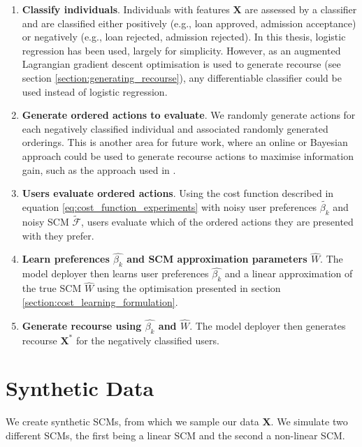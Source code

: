 \begin{enumerate}
	\item \textbf{Classify individuals}. Individuals with features $\mathbf{X}$ are assessed by a classifier and are classified either positively (e.g., loan approved, admission acceptance) or negatively (e.g., loan rejected, admission rejected). In this thesis, logistic regression has been used, largely for simplicity. However, as an augmented Lagrangian gradient descent optimisation is used to generate recourse (see section \ref{section:generating_recourse}), any differentiable classifier could be used instead of logistic regression.
	
	\item \textbf{Generate ordered actions to evaluate}. We randomly generate actions for each negatively classified individual and associated randomly generated orderings. This is another area for future work, where an online or Bayesian approach could be used to generate recourse actions to maximise information gain, such as the approach used in \textcite{detoniPersonalizedAlgorithmicRecourse2023}.
	
	\item \textbf{Users evaluate ordered actions}. Using the cost function described in equation \ref{eq:cost_function_experiments} with noisy user preferences $\tilde{\beta_k}$ and noisy SCM $\tilde{\mathcal{F}}$, users evaluate which of the ordered actions they are presented with they prefer. 
	
	\item \textbf{Learn preferences $\hat{\beta_k}$ and SCM approximation parameters $\hat{W}$}. The model deployer then learns user preferences $\hat{\beta_k}$ and a linear approximation of the true SCM $\hat{W}$ using the optimisation presented in section \ref{section:cost_learning_formulation}.
	
	\item \textbf{Generate recourse using $\hat{\beta_k}$ and $\hat{W}$}. The model deployer then generates recourse $\mathbf{X}^*$ for the negatively classified users.
	
\end{enumerate}
\bigskip


\section{Synthetic Data}

We create synthetic SCMs, from which we sample our data $\mathbf{X}$. We simulate two different SCMs, the first being a linear SCM and the second a non-linear SCM.

